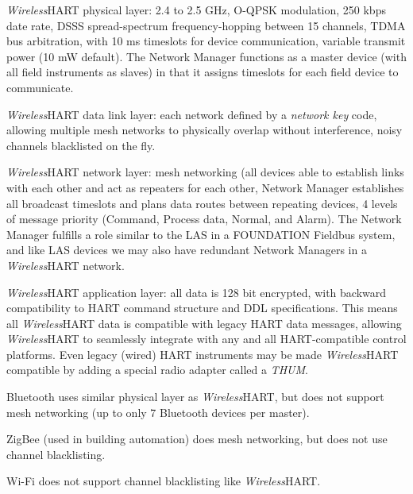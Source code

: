 \vskip 30pt

{\sl Wireless}HART physical layer: 2.4 to 2.5 GHz, O-QPSK modulation, 250 kbps date rate, DSSS spread-spectrum frequency-hopping between 15 channels, TDMA bus arbitration, with 10 ms timeslots for device communication, variable transmit power (10 mW default).  The Network Manager functions as a master device (with all field instruments as slaves) in that it assigns timeslots for each field device to communicate.  

\vskip 10pt

{\sl Wireless}HART data link layer: each network defined by a {\it network key} code, allowing multiple mesh networks to physically overlap without interference, noisy channels blacklisted on the fly.

\vskip 10pt

{\sl Wireless}HART network layer: mesh networking (all devices able to establish links with each other and act as repeaters for each other, Network Manager establishes all broadcast timeslots and plans data routes between repeating devices, 4 levels of message priority (Command, Process data, Normal, and Alarm).  The Network Manager fulfills a role similar to the LAS in a FOUNDATION Fieldbus system, and like LAS devices we may also have redundant Network Managers in a {\sl Wireless}HART network.

\vskip 10pt

{\sl Wireless}HART application layer: all data is 128 bit encrypted, with backward compatibility to HART command structure and DDL specifications.  This means all {\sl Wireless}HART data is compatible with legacy HART data messages, allowing {\sl Wireless}HART to seamlessly integrate with any and all HART-compatible control platforms.  Even legacy (wired) HART instruments may be made {\sl Wireless}HART compatible by adding a special radio adapter called a {\it THUM}.

\vskip 10pt

Bluetooth uses similar physical layer as {\sl Wireless}HART, but does not support mesh networking (up to only 7 Bluetooth devices per master).

\vskip 10pt

ZigBee (used in building automation) does mesh networking, but does not use channel blacklisting.

\vskip 10pt

Wi-Fi does not support channel blacklisting like {\sl Wireless}HART.

\vskip 30pt

